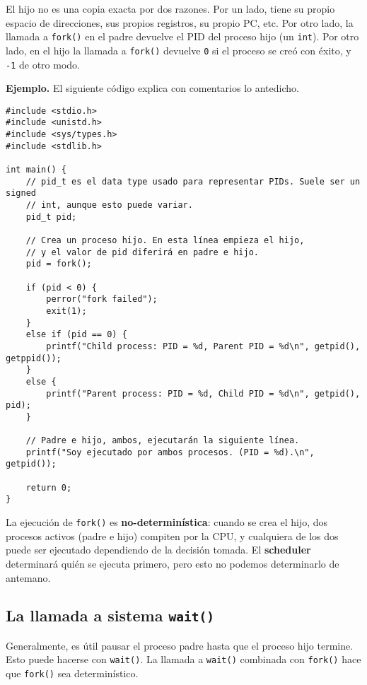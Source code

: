 \documentclass[12pt]{article}
\theoremstyle{definition}
\begin{document}
El hijo no es una copia exacta por dos razones. Por un lado, tiene su propio
espacio de direcciones, sus propios registros, su propio PC, etc. Por otro lado,
la llamada a \texttt{fork()} en el padre devuelve el PID del proceso hijo (un
\texttt{int}). Por otro lado, en el hijo la llamada a \texttt{fork()} devuelve
\texttt{0} si el proceso se creó con éxito, y \texttt{-1} de otro modo.

\begin{shaded}
    \textbf{Ejemplo.} El siguiente código explica con comentarios lo antedicho. 

    \footnotesize
    \begin{verbatim}
#include <stdio.h>      
#include <unistd.h>    
#include <sys/types.h> 
#include <stdlib.h>    

int main() {
    // pid_t es el data type usado para representar PIDs. Suele ser un signed
    // int, aunque esto puede variar.
    pid_t pid;

    // Crea un proceso hijo. En esta línea empieza el hijo, 
    // y el valor de pid diferirá en padre e hijo.
    pid = fork();  

    if (pid < 0) {
        perror("fork failed");
        exit(1);
    }
    else if (pid == 0) {
        printf("Child process: PID = %d, Parent PID = %d\n", getpid(), getppid());
    }
    else {
        printf("Parent process: PID = %d, Child PID = %d\n", getpid(), pid);
    }

    // Padre e hijo, ambos, ejecutarán la siguiente línea.
    printf("Soy ejecutado por ambos procesos. (PID = %d).\n", getpid());

    return 0;
}
    \end{verbatim}
    \normalsize
\end{shaded}

La ejecución de \texttt{fork()} es \textbf{no-determinística}: cuando se crea el
hijo, dos procesos activos (padre e hijo) compiten por la CPU, y cualquiera de
los dos puede ser ejecutado dependiendo de la decisión tomada. El
\textbf{scheduler} determinará quién se ejecuta primero, pero esto no podemos
determinarlo de antemano.

\subsection{La llamada a sistema \texttt{wait()}}

Generalmente, es útil pausar el proceso padre hasta que el proceso hijo termine.
Esto puede hacerse con \texttt{wait()}. La llamada a \texttt{wait()} combinada
con \texttt{fork()} hace que \texttt{fork()} sea determinístico.
\end{document}
